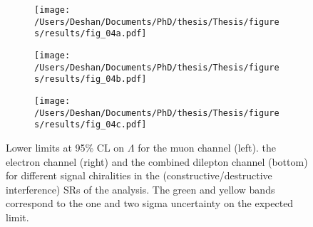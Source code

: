 \begin{figure}[!htpb]
    \centering
    \begin{subfigure}[b]{0.49\textwidth}
        \centering
        \texttt{[image: /Users/Deshan/Documents/PhD/thesis/Thesis/figures/results/fig\_04a.pdf]}
        \label{fig:limit_lambda1}
    \end{subfigure}
    \begin{subfigure}[b]{0.49\textwidth}
        \centering
        \texttt{[image: /Users/Deshan/Documents/PhD/thesis/Thesis/figures/results/fig\_04b.pdf]}
        \label{fig:limit_lambda2}
    \end{subfigure}
    \begin{subfigure}[b]{0.49\textwidth}
        \centering
        \texttt{[image: /Users/Deshan/Documents/PhD/thesis/Thesis/figures/results/fig\_04c.pdf]}
        \label{fig:limit_lambda3}
    \end{subfigure}
    \caption[Lower limits at 95$\%$ CL on $\Lambda$ for the muon channel, the electron channel and the combined dilepton channel for different signal chiralities in the (constructive/destructive interference) SRs of the analysis.]{
    Lower limits at 95$\%$ CL on $\Lambda$ for the muon channel (left). the electron channel (right) and the combined dilepton channel (bottom) for different signal chiralities in the (constructive/destructive interference) SRs of the analysis. The green and yellow bands correspond to the one and two sigma uncertainty on the expected limit.
    }
    \label{fig:limit_lambda}
    \end{figure}

